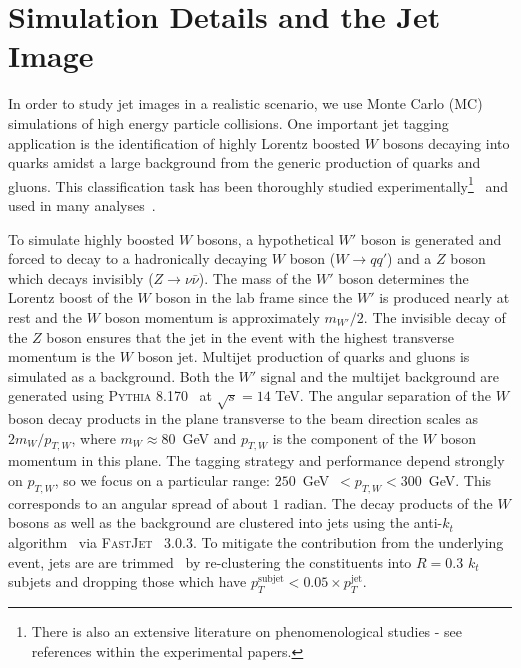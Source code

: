 \section{Simulation Details and the Jet Image}
\label{sec:simulation}

In order to study jet images in a realistic scenario, we use Monte Carlo (MC) simulations of high energy particle collisions. One important jet tagging application is the identification of highly Lorentz boosted $W$ bosons decaying into quarks amidst a large background from the generic production of quarks and gluons.  This classification task has been thoroughly studied experimentally\footnote{There is also an extensive literature on phenomenological studies - see references within the experimental papers.}~\cite{Khachatryan:2014vla,ATL-PHYS-PUB-2015-033,ATL-PHYS-PUB-2014-004} and used in many analyses~\cite{Aad:2015owa,Khachatryan:2014hpa,Khachatryan:2015mta,Khachatryan:2015oba,Khachatryan:2015gza,Khachatryan:2015bma,Khachatryan:2015cwa,Khachatryan:2015ywa,Aad:2014wea,Aad:2015agg,Aad:2015kna,Aad:2015ufa,Aad:2014haa}.  

To simulate highly boosted $W$ bosons, a hypothetical $W'$ boson is generated and forced to decay to a hadronically decaying $W$ boson ($W\rightarrow qq'$) and a $Z$ boson which decays invisibly ($Z\rightarrow \nu\bar{\nu}$).  The mass of the $W'$ boson determines the Lorentz boost of the $W$ boson in the lab frame since the $W'$ is produced nearly at rest and the $W$ boson momentum is approximately $m_{W'}/2$.  The invisible decay of the $Z$ boson ensures that the jet in the event with the highest transverse momentum is the $W$ boson jet.  Multijet production of quarks and gluons is simulated as a background.  Both the $W'$ signal and the multijet background are generated using \textsc{Pythia} 8.170~\cite{Pythia8,Pythia} at $\sqrt{s}=14$ TeV.  The angular separation of the $W$ boson decay products in the plane transverse to the beam direction scales as $2m_{W}/p_{T,W}$, where $m_W\approx 80$~GeV and $p_{T,W}$ is the component of the $W$ boson momentum in this plane.  The tagging strategy and performance depend strongly on $p_{T,W}$, so we focus on a particular range: $250$~GeV~$<p_{T,W}<300$~GeV.  This corresponds to an angular spread of about $1$ radian.  The decay products of the $W$ bosons as well as the background are clustered into jets using the anti-$k_t$ algorithm~\cite{antiktpaper} via \textsc{FastJet}~\cite{fastjet} 3.0.3.  To mitigate the contribution from the underlying event, jets are are trimmed~\cite{trimming} by re-clustering the constituents into $R=0.3$ $k_t$ subjets and dropping those which have $p_T^\text{subjet}<0.05\times p_T^\text{jet}$. 

